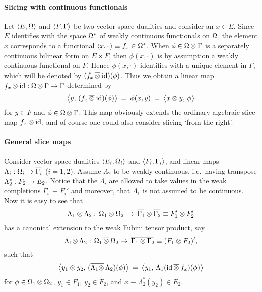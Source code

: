 \paragraph{Slicing with continuous functionals}
Let $\langle E,\Omega \rangle$ and $\langle F,\Gamma \rangle$ be two vector space dualities
and consider an $x \in E$. Since $E$ identifies with the space $\Omega^*$ of
weakly continuous functionals on $\Omega$, the element $x$ corresponds to a
functional $\langle x,\cdot\, \rangle \equiv f_x \in \Omega^*$\@.
When $\phi \in \Omega \,\overline{\otimes}\: \Gamma$ is a separately continuous bilinear
form on $E \times F$, then $\phi(x,\cdot)$ is by assumption a
weakly continuous functional on $F$. Hence $\phi(x,\cdot)$ identifies
with a unique element in $\Gamma$, which will be denoted by $(f_x \,\overline{\otimes}\: \mbox{\rm id})(\phi)$.
Thus we obtain a linear map $f_x \,\overline{\otimes}\: \mbox{\rm id} : \Omega \,\overline{\otimes}\: \Gamma \rightarrow \Gamma$
determined by
\begin{equation} \label{eq:fub_slice_functional}
  \pairM{y}{(f_x \fubtens \id)(\phi)} \:=\: \phi(x,y) \:=\:  \pairM{x \tens y}{\phi}
\end{equation}
for $y\in F$ and $\phi \in \Omega \,\overline{\otimes}\: \Gamma$\@. This map obviously
extends the ordinary algebraic slice map $f_x \otimes \mbox{\rm id}$, and of course
one could also consider slicing \lq from the right\rq\@.


\paragraph{General slice maps}
Consider vector space dualities $\langle E_i,\Omega_i \rangle$ and $\langle F_i,\Gamma_i \rangle$,
and linear maps $\Lambda_i: \Omega_i \rightarrow \overline{\Gamma_i\!}\,$ ($i=1,2$).
Assume $\Lambda_2$ to be weakly continuous, i.e.\ having transpose
$\Lambda_2^* : F_2 \rightarrow E_2$\@.
Notice that the $\Lambda_i$ are allowed to take values in
the weak completions $\overline{\Gamma_i\!}\, \equiv F_i'$ and moreover, that
$\Lambda_1$ is not assumed to be continuous. Now it is easy to see that $$
\Lambda_1 \otimes \Lambda_2: \,
      \Omega_1 \otimes \Omega_2 \,\rightarrow\, \overline{\Gamma_1\!}\, \otimes \overline{\Gamma_2\!}\,
      \equiv F_1' \otimes F_2' $$
has a canonical extension to the weak Fubini tensor product, say
\begin{equation}
   \label{eq:def_Lam1_fubtens_Lam2}
   \overline{\Lambda_1 \otimes}\, \Lambda_2: \, \Omega_1 \,\overline{\otimes}\: \Omega_2 \rightarrow \,
          \overline{\Gamma_1 \otimes \Gamma_2\!}\, \equiv(F_1 \otimes F_2)',
\end{equation}
such that
$$ \pairM{y_1 \tens y_2}{(\overline{\Lambda_1 \tens}\, \Lambda_2)(\phi)}
     \:=\: \pairM{y_1}{\Lambda_1(\id \fubtens f_x)(\phi)} $$
for $\phi \in \Omega_1 \,\overline{\otimes}\: \Omega_2$, $y_1\in F_1$, $y_2\in F_2$,
and $x\equiv\Lambda_2^*(y_2)\in E_2$\@.


